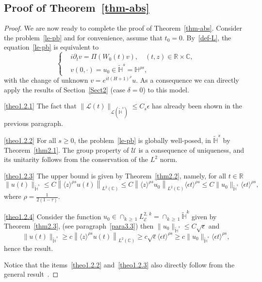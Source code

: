 \documentclass[AHL,Unicode,published]{cedram}
\newcommand{\C}{\mathbb{C}}
\newcommand{\R}{\mathbb{R}}
\newcommand{\HH}{\mathbb{H}}
\newcommand{\E}{\mathcal{E}}
\newcommand{\clL}{\mathcal{L}}
\newcommand{\clU}{\mathcal{U}}
\renewcommand{\L}{\mathscr{L}}
\newcommand*\eps{\epsilon}
\newcommand*\dis{\displaystyle}
\newcommand{\<}{\langle}
\renewcommand{\>}{\rangle}
\newcommand{\R}{\mathbb{R}}
\begin{document}
\subsection{Proof of Theorem~\ref{thm-abs}}
\begin{proof}
We are now ready to complete the proof of Theorem~\ref{thm-abs}. Consider the problem~\eqref{le-pb} and for convenience, assume that $t_0=0$. By~\eqref{def-L}, the equation~\eqref{le-pb} is equivalent to
\[
\begin{cases}
&i\partial_t v= \Pi\left(W_0(t) v\right), \quad (t,z)\in \R\times \C,\\
&v(0,\cdot)= u_0 \in \widetilde{\HH}^{s}={\HH}^{\rho s},
\end{cases}
\]
with the change of unknown $v=e^{it (H+1)^{\rho}}u$. As a consequence we can directly apply the results of Section~\ref{Sect2} (case $\delta=0$) to this model.

\eqref{theo1.2.1} The fact that $\| \L(t) \|_{ \clL(\widetilde{\HH}^{s})} \leq C_s \eps$ has already been shown in the previous paragraph.



\eqref{theo1.2.2} For all $s\geq 0$, the problem~\eqref{le-pb} is globally well-posed, in $\widetilde{\HH}^{s}$ by Theorem~\ref{thm2.1}. The group property of $\clU$ is a consequence of uniqueness, and its unitarity follows from the conservation of the $L^2$ norm.

\eqref{theo1.2.3} The upper bound is given by Theorem~\ref{thm2.2}, namely, for all $t\in \R$
\[
\| u(t)\|_{\widetilde{\HH}^{s}} \leq C \left\|\<z\>^{\rho s} u(t)\right\|_{L^{2}(\C)} \leq C \left\|\<z\>^{\rho s} u_0\right\|_{L^{2}(\C)} \< \eps t\>^{\rho s} \leq C\| u_0\|_{\widetilde{\HH}^{s}} \< \eps t\>^{\rho s},
\]
where $\rho= \tfrac{1}{2(1-\tau)}$.


\eqref{theo1.2.4} Consider the function $\dis u_0 \in \cap_{k\,\geq\,1} L^{2,\,k}_{\E}=
\cap_{k\,\geq\,1} \widetilde{\HH}^{k} $ given by Theorem~\ref{thm2.3}, (see paragraph~\ref{para3.3}) then $\| u_0\|_{\widetilde{\HH}^{s}} \leq C \sqrt{\eps}$ and
\[
\| u(t)\|_{\widetilde{\HH}^{s}} \geq c \left\| \<z\>^{\rho s} u(t)\right\|_{L^2(\C)} \geq c \sqrt{\eps}\<\eps t\>^{\rho s} \geq c\| u_0\|_{\widetilde{\HH}^{s}} \<\eps t\>^{\rho s},
\]
hence the result.

Notice that the items~\eqref{theo1.2.2} and~\eqref{theo1.2.3} also directly follow from the general result~\cite[Theorem~1.5]{MasRo}.
\end{proof}
\end{document}
